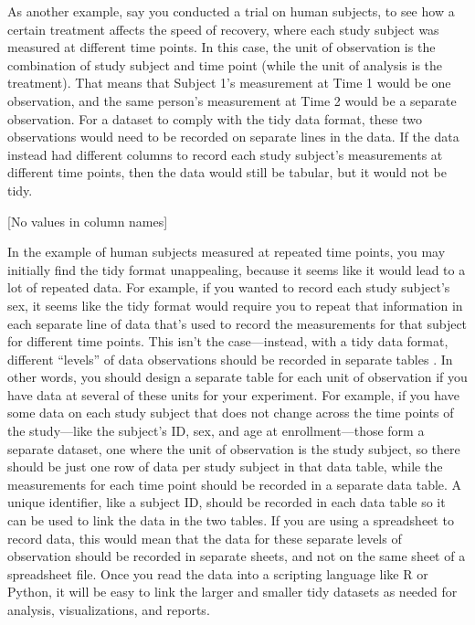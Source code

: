 \documentclass[]{tufte-book}
\begin{document}
As another example, say you conducted a trial on human subjects, to see how
a certain treatment affects the speed of recovery, where each study
subject was measured at different time points. In this case, the unit of
observation is the combination of study subject and time point (while the unit
of analysis is the treatment). That means that Subject 1's measurement at Time 1 would be one
observation, and the same person's measurement at Time 2 would be a separate
observation. For a dataset to comply with the tidy data format, these two
observations would need to be recorded on separate lines in the data. If the
data instead had different columns to record each study subject's measurements
at different time points, then the data would still be tabular, but it would not
be tidy.

{[}No values in column names{]}

In the example of human subjects measured at repeated time points, you may
initially find the tidy format unappealing, because it seems like it would
lead to a lot of repeated data. For example, if you wanted to record each study
subject's sex, it seems like the tidy format would require you to repeat that
information in each separate line of data that's used to record the measurements
for that subject for different time points. This isn't the case---instead, with
a tidy data format, different ``levels'' of data observations should be recorded
in separate tables \citep{wickham2014tidy}. In other words, you should design a
separate table for each unit of observation if you have data at several of these
units for your experiment. For example, if you have some data on each study
subject that does not change across the time points of the study---like the
subject's ID, sex, and age at enrollment---those form a separate dataset, one
where the unit of observation is the study subject, so there should be just one
row of data per study subject in that data table, while the measurements for
each time point should be recorded in a separate data table. A unique
identifier, like a subject ID, should be recorded in each data table so it can
be used to link the data in the two tables. If you are using a spreadsheet to
record data, this would mean that the data for these separate levels of
observation should be recorded in separate sheets, and not on the same sheet of
a spreadsheet file. Once you read the data into a scripting language like R or
Python, it will be easy to link the larger and smaller tidy datasets as needed
for analysis, visualizations, and reports.
\end{document}
